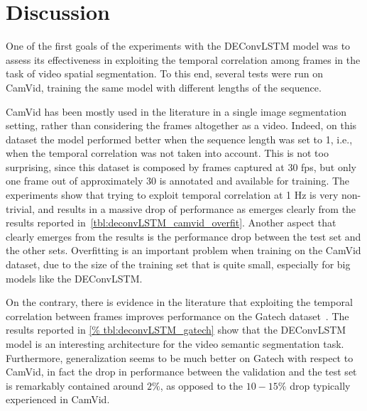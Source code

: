 \section{Discussion}\label{sec:deconvLSTM_discussion}
One of the first goals of the experiments with the DEConvLSTM model was to
assess its effectiveness in exploiting the temporal correlation among frames in
the task of video spatial segmentation. To this end, several tests were run on
CamVid, training the same model with different lengths of the sequence.

CamVid has been mostly used in the literature in a single image
segmentation setting, rather than considering the frames altogether as a video.
Indeed, on this dataset the model performed better when the sequence length was
set to 1, i.e., when the temporal correlation was not taken into account. This
is not too surprising, since this dataset is composed by frames captured at 30
fps, but only one frame out of approximately 30 is annotated and available for
training. The experiments show that trying to exploit temporal correlation at 1
Hz is very non-trivial, and results in a massive drop of performance as
emerges clearly from the results reported
in~\autoref{tbl:deconvLSTM_camvid_overfit}. Another aspect that clearly emerges
from the results is the performance drop between the test set and the other
sets. Overfitting is an important problem when training on the CamVid dataset,
due to the size of the training set that is quite small, especially for big
models like the DEConvLSTM.

On the contrary, there is evidence in the literature that exploiting the
temporal correlation between frames improves performance on the Gatech
dataset~\citep{Tran16v2v}. The results reported in \autoref{%
tbl:deconvLSTM_gatech} show that the DEConvLSTM model is an interesting
architecture for the video semantic segmentation task. Furthermore,
generalization seems to be much better on Gatech with respect to CamVid, in
fact the drop in performance between the validation and the test set is
remarkably contained around $2\%$, as opposed to the $10-15\%$ drop typically
experienced in CamVid.


